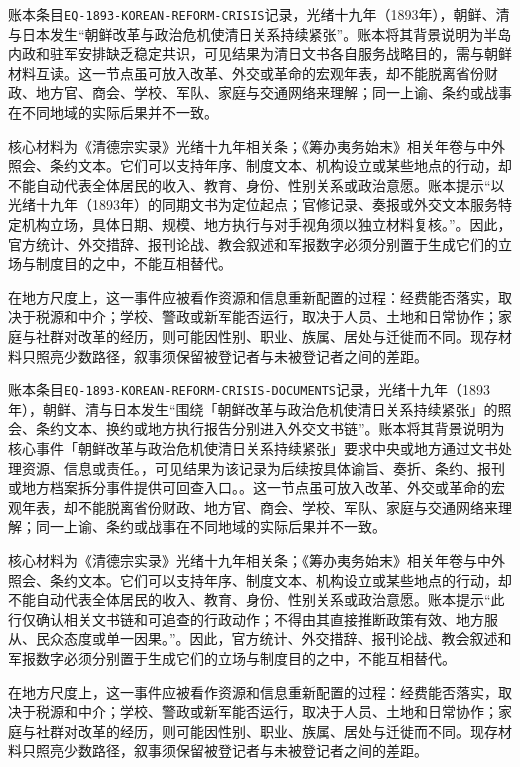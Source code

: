 账本条目\texttt{EQ-1893-KOREAN-REFORM-CRISIS}记录，光绪十九年（1893年），朝鲜、清与日本发生“朝鲜改革与政治危机使清日关系持续紧张”。账本将其背景说明为半岛内政和驻军安排缺乏稳定共识，可见结果为清日文书各自服务战略目的，需与朝鲜材料互读。这一节点虽可放入改革、外交或革命的宏观年表，却不能脱离省份财政、地方官、商会、学校、军队、家庭与交通网络来理解；同一上谕、条约或战事在不同地域的实际后果并不一致。

核心材料为《清德宗实录》光绪十九年相关条；《筹办夷务始末》相关年卷与中外照会、条约文本。它们可以支持年序、制度文本、机构设立或某些地点的行动，却不能自动代表全体居民的收入、教育、身份、性别关系或政治意愿。账本提示“以光绪十九年（1893年）的同期文书为定位起点；官修记录、奏报或外交文本服务特定机构立场，具体日期、规模、地方执行与对手视角须以独立材料复核。”。因此，官方统计、外交措辞、报刊论战、教会叙述和军报数字必须分别置于生成它们的立场与制度目的之中，不能互相替代。

在地方尺度上，这一事件应被看作资源和信息重新配置的过程：经费能否落实，取决于税源和中介；学校、警政或新军能否运行，取决于人员、土地和日常协作；家庭与社群对改革的经历，则可能因性别、职业、族属、居处与迁徙而不同。现存材料只照亮少数路径，叙事须保留被登记者与未被登记者之间的差距。

账本条目\texttt{EQ-1893-KOREAN-REFORM-CRISIS-DOCUMENTS}记录，光绪十九年（1893年），朝鲜、清与日本发生“围绕「朝鲜改革与政治危机使清日关系持续紧张」的照会、条约文本、换约或地方执行报告分别进入外交文书链”。账本将其背景说明为核心事件「朝鲜改革与政治危机使清日关系持续紧张」要求中央或地方通过文书处理资源、信息或责任。，可见结果为该记录为后续按具体谕旨、奏折、条约、报刊或地方档案拆分事件提供可回查入口。。这一节点虽可放入改革、外交或革命的宏观年表，却不能脱离省份财政、地方官、商会、学校、军队、家庭与交通网络来理解；同一上谕、条约或战事在不同地域的实际后果并不一致。

核心材料为《清德宗实录》光绪十九年相关条；《筹办夷务始末》相关年卷与中外照会、条约文本。它们可以支持年序、制度文本、机构设立或某些地点的行动，却不能自动代表全体居民的收入、教育、身份、性别关系或政治意愿。账本提示“此行仅确认相关文书链和可追查的行政动作；不得由其直接推断政策有效、地方服从、民众态度或单一因果。”。因此，官方统计、外交措辞、报刊论战、教会叙述和军报数字必须分别置于生成它们的立场与制度目的之中，不能互相替代。

在地方尺度上，这一事件应被看作资源和信息重新配置的过程：经费能否落实，取决于税源和中介；学校、警政或新军能否运行，取决于人员、土地和日常协作；家庭与社群对改革的经历，则可能因性别、职业、族属、居处与迁徙而不同。现存材料只照亮少数路径，叙事须保留被登记者与未被登记者之间的差距。

